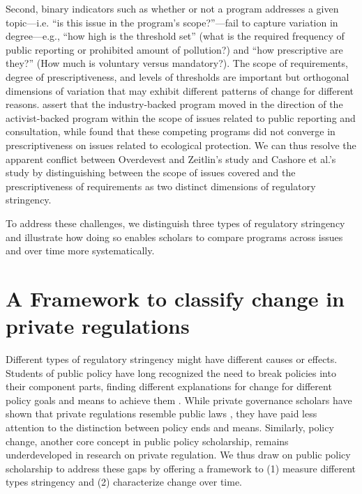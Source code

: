 \documentclass[
      12pt,
            Review ]{article}
\begin{document}
Second, binary indicators such as whether or not a program addresses a
given topic---i.e. ``is this issue in the program's scope?''---fail to
capture variation in degree---e.g., ``how high is the threshold set''
(what is the required frequency of public reporting or prohibited amount
of pollution?) and ``how prescriptive are they?'' (How much is voluntary
versus mandatory?). The scope of requirements, degree of
prescriptiveness, and levels of thresholds are important but orthogonal
dimensions of variation that may exhibit different patterns of change
for different reasons. \citet{Overdevest2014} assert that the
industry-backed program moved in the direction of the activist-backed
program within the scope of issues related to public reporting and
consultation, while \citet{Cashore2004} found that these competing
programs did not converge in prescriptiveness on issues related to
ecological protection. We can thus resolve the apparent conflict between
Overdevest and Zeitlin's study and Cashore et al.'s study by
distinguishing between the scope of issues covered and the
prescriptiveness of requirements as two distinct dimensions of
regulatory stringency.

To address these challenges, we distinguish three types of regulatory
stringency and illustrate how doing so enables scholars to compare
programs across issues and over time more systematically.

\section{A Framework to classify change in private
regulations}\label{a-framework-to-classify-change-in-private-regulations}

Different types of regulatory stringency might have different causes or
effects. Students of public policy have long recognized the need to
break policies into their component parts, finding different
explanations for change for different policy goals and means to achieve
them \citep{Cashore1997, Hall1993, Weimer2017}. While private governance
scholars have shown that private regulations resemble public laws
\citep[\citet{Meidinger2006}]{Meidinger2003}, they have paid less
attention to the distinction between policy ends and means. Similarly,
policy change, another core concept in public policy scholarship,
remains underdeveloped in research on private regulation. We thus draw
on public policy scholarship to address these gaps by offering a
framework to (1) measure different types stringency and (2) characterize
change over time.
\end{document}
